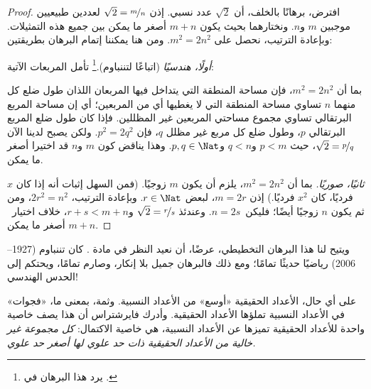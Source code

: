 \documentclass[../../../include/open-logic-section]{subfiles}
\begin{document}
\begin{proof}
افترض، برهانًا بالخلف، أن $\sqrt{2}$ عدد نسبي. إذن $\sqrt{2} =
\nicefrac{m}{n}$ لعددين طبيعيين موجبين $m$ و$n$. ونختارهما بحيث يكون
$m+n$ أصغر ما يمكن بين جميع هذه التمثيلات. وبإعادة الترتيب، نحصل على
$m^{2} = 2n^{2}$. ومن هنا يمكننا إتمام البرهان بطريقتين:

\emph{أولًا، هندسيًا} (اتباعًا لتننباوم).\footnote{يرد هذا البرهان في
\cite{Conway2006}.} تأمل المربعات الآتية:
\begin{center}
\end{center}
بما أن $m^2 = 2n^2$، فإن مساحة المنطقة التي يتداخل فيها المربعان اللذان طول
ضلع كل منهما $n$ تساوي مساحة المنطقة التي لا يغطيها أي من
المربعين؛ أي إن مساحة المربع البرتقالي تساوي مجموع مساحتي المربعين غير
المظللين. فإذا كان طول ضلع المربع البرتقالي $p$، وطول ضلع كل مربع غير
مظلل $q$، فإن $p^2 = 2q^2$. ولكن يصبح لدينا الآن
$\sqrt{2} = \nicefrac{p}{q}$، حيث $p < m$ و$q < n$ و$p, q \in
\Nat$. وهذا يناقض كون $m$ و$n$ قد اختيرا أصغر ما يمكن.

\emph{ثانيًا، صوريًا.} بما أن $m^{2} = 2n^{2}$، يلزم أن يكون $m$
زوجيًا. (فمن السهل إثبات أنه إذا كان $x$ فرديًا، كان $x^2$ فرديًا.)
إذن $m = 2r$، لبعض $r \in \Nat$. وبإعادة الترتيب، $2r^2 = n^2$،
ومن ثم يكون $n$ زوجيًا أيضًا؛ فليكن~$n=2s$. وعندئذ
$\sqrt{2}=\nicefrac{r}{s}$ و$r+s<m+n$، خلاف اختيار~$m+n$ أصغر ما يمكن.
\end{proof}

ويتيح لنا هذا البرهان التخطيطي، عرضًا، أن نعيد النظر في مادة
. كان تننباوم (1927--2006) رياضيًا حديثًا
تمامًا؛ ومع ذلك فالبرهان جميل بلا إنكار، وصارم تمامًا، ويحتكم إلى الحدس الهندسي!

على أي حال، الأعداد الحقيقية «أوسع» من الأعداد النسبية. وثمة، بمعنى ما،
«فجوات» في الأعداد النسبية تملؤها الأعداد الحقيقية. وأدرك فايرشتراس أن
هذا يصف خاصية واحدة للأعداد الحقيقية تميزها عن الأعداد النسبية، هي خاصية
الاكتمال: \emph{كل مجموعة غير خالية من الأعداد الحقيقية ذات حد علوي لها
أصغر حد علوي.}
\end{document}

